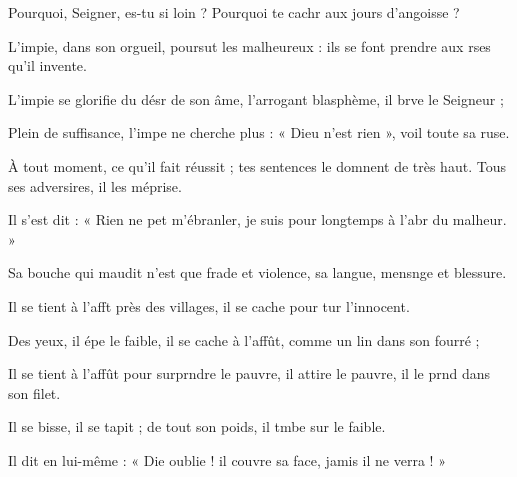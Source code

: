 \item Pourquoi, Seigner, es-tu si loin ?\psstar{} Pourquoi te cachr aux jours d’angoisse ?
\item L’impie, dans son orgueil, poursut les malheureux :\psstar{} ils se font prendre aux rses qu’il invente.
\item L’impie se glorifie du désr de son âme,\psstar{} l’arrogant blasphème, il brve le Seigneur ;
\item Plein de suffisance, l’impe ne cherche plus :\psstar{} « Dieu n’est rien », voil toute sa ruse.
\item À tout moment, ce qu’il fait réussit ;\pscross{} tes sentences le domnent de très haut.\psstar{} Tous ses adversires, il les méprise.
\item Il s’est dit : « Rien ne pet m’ébranler,\psstar{} je suis pour longtemps à l’abr du malheur. »
\item Sa bouche qui maudit n’est que frade et violence,\psstar{} sa langue, mensnge et blessure.
\item Il se tient à l’afft près des villages,\psstar{} il se cache pour tur l’innocent.
\item Des yeux, il épe le faible,\psstar{} il se cache à l’affût, comme un lin dans son fourré ;
\item Il se tient à l’affût pour surprndre le pauvre,\psstar{} il attire le pauvre, il le prnd dans son filet.
\item Il se bisse, il se tapit ;\psstar{} de tout son poids, il tmbe sur le faible.
\item Il dit en lui-même : « Die oublie !\psstar{} il couvre sa face, jamis il ne verra ! »